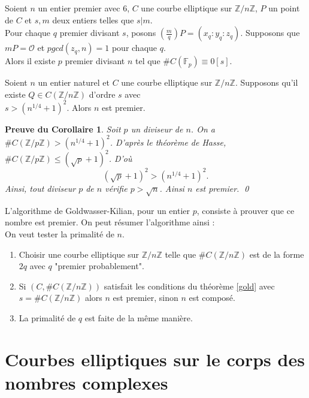 \documentclass[a4paper]{article}
\newtheorem*{preuve}{Preuve du Corollaire}
\begin{document}
\begin{theorem} \label{gold}
Soient $n$ un entier premier avec 6, $C$ une courbe elliptique sur $\mathbb{Z}/n\mathbb{Z}$, $P$ un point de $C$ et $s,m$ deux entiers telles que $s|m$. \\
 Pour chaque $q$ premier divisant $s$, posons $(\frac{m}{q})P=(x_{q}:y_{q}:z_{q})$. 
Supposons que $mP=\mathcal{O}$ et $pgcd(z_{q},n)=1$ pour chaque $q$. \\
Alors il existe $p$ premier divisant $n$ tel que $\#C(\mathbb{F}_{p}) \equiv 0 [s]$.
\end{theorem}


\begin{cor}
Soient $n$ un entier naturel et $C$ une courbe elliptique sur $\mathbb{Z}/n\mathbb{Z}$. Supposons qu'il existe $Q \in C(\mathbb{Z}/n\mathbb{Z})$ d'ordre $s$ avec \\
$s > (n^{1/4}+1)^2$. Alors
$n$ est premier. 
\end{cor}
\begin{preuve} 
\normalfont
Soit $p$ un diviseur de $n$. On a $\#C(\mathbb{Z}/p\mathbb{Z}) > (n^{1/4}+1)^2 $. D'après le théorème de Hasse,
$ \#C(\mathbb{Z}/p\mathbb{Z}) \leqslant (\sqrt{p}+1)^2$. D'où
\begin{equation*}
(\sqrt{p}+1)^2 > (n^{1/4}+1)^2.
\end{equation*}
Ainsi, tout diviseur $p$ de $n$ vérifie $p>\sqrt{n}$. Ainsi $n$ est premier. \qed
\end{preuve}
\noindent L'algorithme de Goldwasser-Kilian, pour un entier $p$, consiste à prouver que ce nombre est premier. 
On peut résumer l'algorithme ainsi :
\\
On veut tester la primalité de $n$.
\begin{enumerate}
\item Choisir une courbe elliptique sur $\mathbb{Z}/n\mathbb{Z}$ telle que $\#C(\mathbb{Z}/n\mathbb{Z})$ est de la forme $2q$ avec $q$ "premier probablement".
\item Si $(C,\#C(\mathbb{Z}/n\mathbb{Z}))$ satisfait les conditions du théorème \ref{gold} avec $s=\#C(\mathbb{Z}/n\mathbb{Z})$ alors $n$ est premier, sinon $n$ est composé.
\item La primalité de $q$ est faite de la même manière.
\end{enumerate}

\newpage
\section{Courbes elliptiques sur le corps des nombres complexes}
\end{document}
